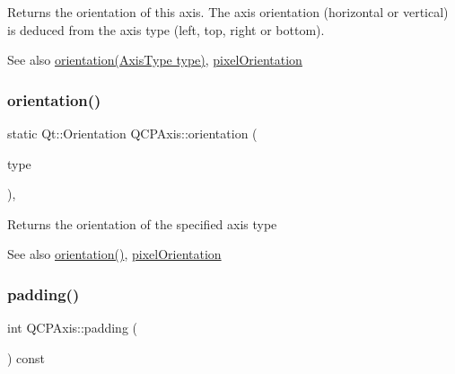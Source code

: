 Returns the orientation of this axis. The axis orientation (horizontal or vertical) is deduced from the axis type (left, top, right or bottom).

\begin{DoxySeeAlso}{See also}
\hyperlink{class_q_c_p_axis_a9a68b3e45f1b1e33d4d807822342516c}{orientation(\+Axis\+Type type)}, \hyperlink{class_q_c_p_axis_a45c45bed7e5666683b8d56afa66fa51f}{pixel\+Orientation} 
\end{DoxySeeAlso}
\mbox{\label{class_q_c_p_axis_a9a68b3e45f1b1e33d4d807822342516c}} 
\subsubsection{\texorpdfstring{orientation()}{orientation()}\hspace{0.1cm}{\footnotesize\ttfamily [2/2]}}
{\footnotesize\ttfamily static Qt\+::\+Orientation Q\+C\+P\+Axis\+::orientation (\begin{DoxyParamCaption}\item[{\hyperlink{class_q_c_p_axis_ae2bcc1728b382f10f064612b368bc18a}{Axis\+Type}}]{type }\end{DoxyParamCaption})\hspace{0.3cm}{\ttfamily [inline]}, {\ttfamily [static]}}

Returns the orientation of the specified axis type

\begin{DoxySeeAlso}{See also}
\hyperlink{class_q_c_p_axis_ab988ef4538e2655bb77bd138189cd42e}{orientation()}, \hyperlink{class_q_c_p_axis_a45c45bed7e5666683b8d56afa66fa51f}{pixel\+Orientation} 
\end{DoxySeeAlso}
\mbox{\label{class_q_c_p_axis_a07df379d5c017b8f3a4702532eb037b2}} 
\subsubsection{\texorpdfstring{padding()}{padding()}}
{\footnotesize\ttfamily int Q\+C\+P\+Axis\+::padding (\begin{DoxyParamCaption}{ }\end{DoxyParamCaption}) const\hspace{0.3cm}{\ttfamily [inline]}}

